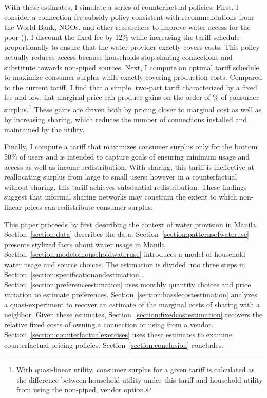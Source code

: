 \documentclass[12pt]{article}
\begin{document}
With these estimates, I simulate a series of counterfactual policies.  First, I consider a connection fee subsidy policy consistent with recommendations from the World Bank, NGOs, and other researchers to improve water access for the poor (\cite{komives2005water,jimenez2014factors,mcintosh2003asian}).  I discount the fixed fee by 12\% while increasing the tariff schedule proportionally to ensure that the water provider exactly covers costs.  This policy actually reduces access because households stop sharing connections and substitute towards non-piped sources.  Next, I compute an optimal tariff schedule to maximize consumer surplus while exactly covering production costs.  Compared to the current tariff, I find that a simple, two-part tariff characterized by a fixed fee and low, flat marginal price can produce gains on the order of \unskip\% of consumer surplus.\footnote{With quasi-linear utility, consumer surplus for a given tariff is calculated as the difference between household utility under this tariff and household utility from using the non-piped, vendor option.}  These gains are driven both by pricing closer to marginal cost as well as by increasing sharing, which reduces the number of connections installed and maintained by the utility.  

Finally, I compute a tariff that maximizes consumer surplus only for the bottom 50\% of users and is intended to capture goals of ensuring minimum usage and access as well as income redistribution.  With sharing, this tariff is ineffective at reallocating surplus from large to small users; however in a counterfactual without sharing, this tariff achieves substantial redistribution.  These findings suggest that informal sharing networks may constrain the extent to which non-linear prices can redistribute consumer surplus.

This paper proceeds by first describing the context of water provision in Manila.  Section~\ref{section:data} describes the data.  Section~\ref{section:patternsofwateruse} presents stylized facts about water usage in Manila.  Section~\ref{section:modelofhouseholdwateruse} introduces a model of household water usage and source choices.  The estimation is divided into three steps in Section~\ref{section:specificationandestimation}.  Section~\ref{section:preferenceestimation} uses monthly quantity choices and price variation to estimate preferences.  Section~\ref{section:hasslecostestimation} analyzes a quasi-experiment to recover an estimate of the marginal costs of sharing with a neighbor.  Given these estimates, Section~\ref{section:fixedcostestimation} recovers the relative fixed costs of owning a connection or using from a vendor.  Section~\ref{section:counterfactualexercises} uses these estimates to examine counterfactual pricing policies.  Section~\ref{section:conclusion} concludes.
\end{document}
